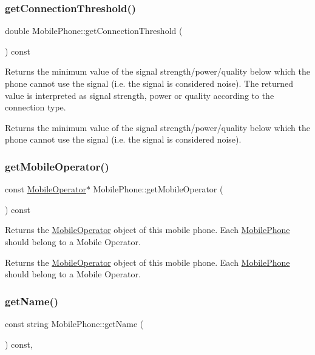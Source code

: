 \subsubsection{\texorpdfstring{getConnectionThreshold()}{getConnectionThreshold()}}
{\footnotesize\ttfamily double Mobile\+Phone\+::get\+Connection\+Threshold (\begin{DoxyParamCaption}{ }\end{DoxyParamCaption}) const}

Returns the minimum value of the signal strength/power/quality below which the phone cannot use the signal (i.\+e. the signal is considered noise). The returned value is interpreted as signal strength, power or quality according to the connection type. \begin{DoxyReturn}{Returns}
the minimum value of the signal strength/power/quality below which the phone cannot use the signal (i.\+e. the signal is considered noise). 
\end{DoxyReturn}
\mbox{\label{class_mobile_phone_aba72025d08c382d8533e0cbb9166999b}} 
\subsubsection{\texorpdfstring{getMobileOperator()}{getMobileOperator()}}
{\footnotesize\ttfamily const \mbox{\hyperlink{class_mobile_operator}{Mobile\+Operator}}$\ast$ Mobile\+Phone\+::get\+Mobile\+Operator (\begin{DoxyParamCaption}{ }\end{DoxyParamCaption}) const}

Returns the \mbox{\hyperlink{class_mobile_operator}{Mobile\+Operator}} object of this mobile phone. Each \mbox{\hyperlink{class_mobile_phone}{Mobile\+Phone}} should belong to a Mobile Operator. \begin{DoxyReturn}{Returns}
the \mbox{\hyperlink{class_mobile_operator}{Mobile\+Operator}} object of this mobile phone. Each \mbox{\hyperlink{class_mobile_phone}{Mobile\+Phone}} should belong to a Mobile Operator. 
\end{DoxyReturn}
\mbox{\label{class_mobile_phone_a1eeac3141baafa75ebcf26fc3a0e4068}} 
\subsubsection{\texorpdfstring{getName()}{getName()}}
{\footnotesize\ttfamily const string Mobile\+Phone\+::get\+Name (\begin{DoxyParamCaption}{ }\end{DoxyParamCaption}) const\hspace{0.3cm}{\ttfamily [override]}, {\ttfamily [virtual]}}


